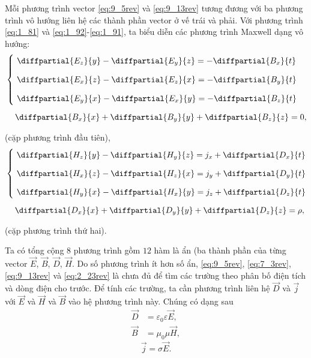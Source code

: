 Mỗi phương trình vector \eqref{eq:9_5rev} và \eqref{eq:9_13rev} tương đương với ba phương trình vô hướng liên hệ các thành phần vector ở vế trái và phải.
Với phương trình \eqref{eq:1_81} và \eqref{eq:1_92}-\eqref{eq:1_91}, ta biểu diễn các phương trình Maxwell dạng vô hướng:
\begin{align}
    & \begin{cases}
        &\!\!\!\! \diffpartial{E_z}{y} - \diffpartial{E_y}{z} = - \diffpartial{B_x}{t}\\[8pt]
        &\!\!\!\! \diffpartial{E_x}{z} - \diffpartial{E_z}{x} = - \diffpartial{B_y}{t}\\[8pt]
        &\!\!\!\! \diffpartial{E_y}{x} - \diffpartial{E_x}{y} = - \diffpartial{B_z}{t}\\
    \end{cases}\label{eq:9_15}\\[5pt]
    & \quad\,\diffpartial{B_x}{x} + \diffpartial{B_y}{y} + \diffpartial{B_z}{z} = 0,\label{eq:9_16}
\end{align}

\noindent
(cặp phương trình đầu tiên),
\begin{align}
    & \begin{cases}
        &\!\!\!\! \diffpartial{H_z}{y} - \diffpartial{H_y}{z} = j_x + \diffpartial{D_x}{t}\\[8pt]
        &\!\!\!\! \diffpartial{H_x}{z} - \diffpartial{H_z}{x} = j_y + \diffpartial{D_y}{t}\\[8pt]
        &\!\!\!\! \diffpartial{H_y}{x} - \diffpartial{H_x}{y} = j_z + \diffpartial{D_z}{t}
    \end{cases}\label{eq:9_17}\\[5pt]
    & \quad\,\diffpartial{D_x}{x} + \diffpartial{D_y}{y} + \diffpartial{D_z}{z} = \rho,\label{eq:9_18}
\end{align}

\noindent
(cặp phương trình thứ hai).

Ta có tổng cộng $8$ phương trình gồm $12$ hàm là ẩn (ba thành phần của từng vector $\vec{E}$, $\vec{B}$, $\vec{D}$, $\vec{H}$.
Do số phương trình ít hơn số ẩn, \eqref{eq:9_5rev}, \eqref{eq:7_3rev}, \eqref{eq:9_13rev} và \eqref{eq:2_23rev} là chưa đủ để tìm các trường theo phân bố điện tích và dòng điện cho trước.
Để tính các trường, ta cần phương trình liên hệ $\vec{D}$ và $\vec{j}$ với $\vec{E}$ và $\vec{H}$ và $\vec{B}$ vào hệ phương trình này.
Chúng có dạng sau
\begin{align}
    \vec{D} &= \varepsilon_0\varepsilon \vec{E}, \label{eq:2_21rev}\tag{2.21}\\
    \vec{B} &= \mu_0\mu \vec{H}, \label{eq:7_17rev}\tag{7.17}
\end{align}
\begin{equation}\label{eq:5_22rev}
    \vec{j} = \sigma \vec{E}. \tag{5.22}
\end{equation}


